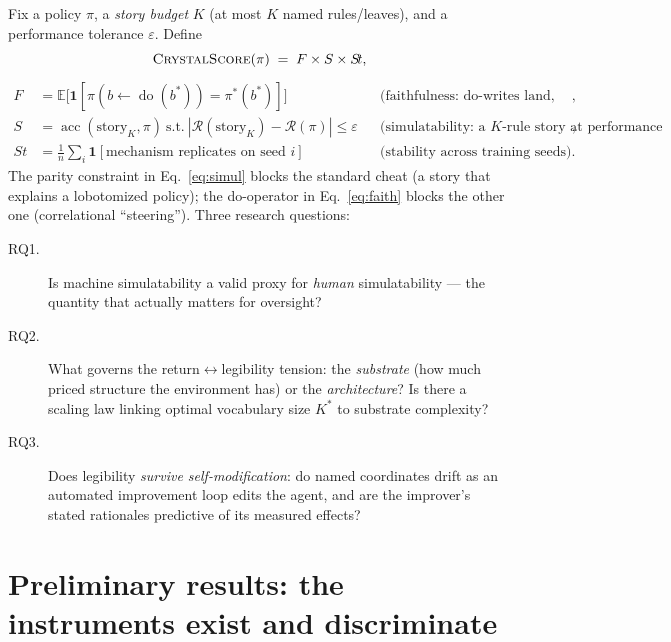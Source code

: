 \documentclass[11pt]{article}
\newcommand{\E}{\mathbb{E}}
\newcommand{\ind}{\mathbf{1}}
\begin{document}
Fix a policy $\pi$, a \emph{story budget} $K$ (at most $K$ named rules/leaves), and a
performance tolerance $\varepsilon$. Define
\begin{equation}
\textsc{CrystalScore}(\pi) \;=\; F \times S \times S\!t,
\label{eq:cs}
\end{equation}
\begin{align}
F &= \E\big[\ind[\pi(b \leftarrow \operatorname{do}(b^{*})) = \pi^{*}(b^{*})]\big]
&&\text{(faithfulness: do-writes land, judged vs a reference optimum)},
\label{eq:faith}\\
S &= \operatorname{acc}(\text{story}_{K}, \pi)
\ \text{s.t.}\ |\mathcal{R}(\text{story}_K) - \mathcal{R}(\pi)| \le \varepsilon
&&\text{(simulatability: a $K$-rule story at performance parity)},
\label{eq:simul}\\
S\!t &= \tfrac{1}{n}\textstyle\sum_{i} \ind[\text{mechanism replicates on seed } i]
&&\text{(stability across training seeds)}.
\label{eq:stab}
\end{align}
The parity constraint in Eq.~\ref{eq:simul} blocks the standard cheat (a story that explains a
lobotomized policy); the do-operator in Eq.~\ref{eq:faith} \citep{pearl2009} blocks the other
one (correlational ``steering''). Three research questions:
\begin{description}
  \item[RQ1.] Is machine simulatability a valid proxy for \emph{human} simulatability ---
        the quantity that actually matters for oversight?
  \item[RQ2.] What governs the return$\leftrightarrow$legibility tension: the \emph{substrate}
        (how much priced structure the environment has) or the \emph{architecture}? Is there a
        scaling law linking optimal vocabulary size $K^{*}$ to substrate complexity?
  \item[RQ3.] Does legibility \emph{survive self-modification}: do named coordinates drift
        as an automated improvement loop edits the agent, and are the improver's stated
        rationales predictive of its measured effects?
\end{description}

\section{Preliminary results: the instruments exist and discriminate}
\label{sec:prelim}
\end{document}
